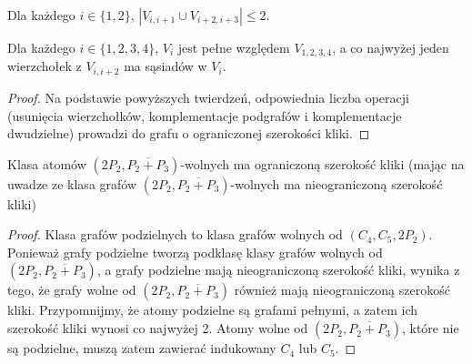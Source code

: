 \documentclass[polish]{beamer}
\begin{document}
\begin{frame}
    \begin{theorem}
        \renewcommand{\qedsymbol}{}
        Dla każdego $i \in \{1, 2\}$, $|V_{i,i+1} \cup V_{i+2,i+3}| \leq 2$.
    \end{theorem}
    \graphSmaller
\end{frame}

\begin{frame}
    \begin{theorem}
        \renewcommand{\qedsymbol}{}
        Dla każdego $i \in \{1, 2, 3, 4\}$, $V_i$ jest pełne względem $V_{1,2,3,4}$, a co najwyżej jeden wierzchołek z $V_{i,i+2}$ ma sąsiadów w $V_i$.
    \end{theorem}
    \graphSmaller
\end{frame}

\begin{frame}
    \begin{proof}     
        Na podstawie powyższych twierdzeń, odpowiednia liczba operacji (usunięcia wierzchołków, komplementacje podgrafów i komplementacje dwudzielne) prowadzi do grafu o ograniczonej szerokości kliki.
        \end{proof}
\end{frame}

\begin{frame}
    \begin{theorem}
        Klasa atomów $(2P_2, \overline{P_2 + P_3})$-wolnych ma ograniczoną szerokość kliki (mając na uwadze ze klasa grafów $(2P_2, \overline{P_2 + P_3})$-wolnych ma nieograniczoną szerokość kliki)
    \end{theorem}
    \begin{proof}
        Klasa grafów podzielnych to klasa grafów wolnych od $(C_4, C_5, 2P_2)$. Ponieważ grafy podzielne tworzą podklasę klasy grafów wolnych od $(2P_2, \overline{P_2 + P_3})$, a grafy podzielne mają nieograniczoną szerokość kliki, wynika z tego, że grafy wolne od $(2P_2, \overline{P_2 + P_3})$ również mają nieograniczoną szerokość kliki. Przypomnijmy, że atomy podzielne są grafami pełnymi, a zatem ich szerokość kliki wynosi co najwyżej 2. Atomy wolne od $(2P_2, \overline{P_2 + P_3})$, które nie są podzielne, muszą zatem zawierać indukowany $C_4$ lub $C_5$.
    \end{proof}
\end{frame}
\end{document}
